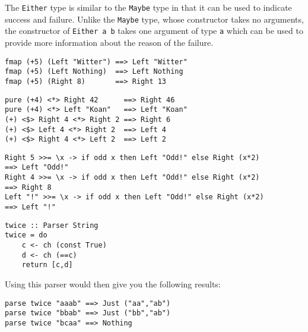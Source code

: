 The \texttt{\small Either} type is similar to the \texttt{\small Maybe} type in that it can be used to indicate success and failure. Unlike the \texttt{\small Maybe} type, whose  constructor takes no arguments, the  constructor of \texttt{\small Either a b} takes one argument of type \texttt{\small a} which can be used to provide more information about the reason of the failure.

\begin{verbatim}
fmap (+5) (Left "Witter") ==> Left "Witter" 
fmap (+5) (Left Nothing)  ==> Left Nothing
fmap (+5) (Right 8)       ==> Right 13
\end{verbatim}

\begin{verbatim}
pure (+4) <*> Right 42      ==> Right 46 
pure (+4) <*> Left "Koan"   ==> Left "Koan"
(+) <$> Right 4 <*> Right 2 ==> Right 6
(+) <$> Left 4 <*> Right 2  ==> Left 4
(+) <$> Right 4 <*> Left 2  ==> Left 2
\end{verbatim}

\begin{verbatim}
Right 5 >>= \x -> if odd x then Left "Odd!" else Right (x*2) 
==> Left "Odd!"
Right 4 >>= \x -> if odd x then Left "Odd!" else Right (x*2) 
==> Right 8
Left "!" >>= \x -> if odd x then Left "Odd!" else Right (x*2)
==> Left "!"
\end{verbatim}


\taskLine 

\begin{verbatim}
twice :: Parser String
twice = do
    c <- ch (const True)
    d <- ch (==c)
    return [c,d]
\end{verbatim}
Using this parser would then give you the following results:
\begin{verbatim}
parse twice "aaab" ==> Just ("aa","ab")
parse twice "bbab" ==> Just ("bb","ab")
parse twice "bcaa" ==> Nothing
\end{verbatim}

